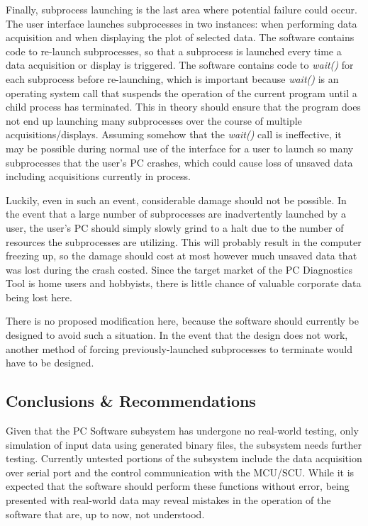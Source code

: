 Finally, subprocess launching is the last area where potential failure could occur. The user interface
launches subprocesses in two instances: when performing data acquisition and when displaying the plot
of selected data. The software contains code to re-launch subprocesses, so that a subprocess is launched
every time a data acquisition or display is triggered. The software contains code to \textit{wait()} 
for each subprocess before re-launching, which is important because \textit{wait()} is an operating system
call that suspends the operation of the current program until a child process has terminated. This in theory
should ensure that the program does not end up launching many subprocesses over the course of multiple 
acquisitions/displays. Assuming somehow that the \textit{wait()} call is ineffective, it may
be possible during normal use of the interface for a user to launch so many subprocesses that the user's
PC crashes, which could cause loss of unsaved data including acquisitions currently in process.

Luckily, even in such an event, considerable damage should not be possible. In the event that a large
number of subprocesses are inadvertently launched by a user, the user's PC should simply slowly grind
to a halt due to the number of resources the subprocesses are utilizing. This will probably result in
the computer freezing up, so the damage should cost at most however much unsaved data that was lost
during the crash costed. Since the target market of the PC Diagnostics Tool is home users and hobbyists,
there is little chance of valuable corporate data being lost here.

There is no proposed modification here, because the software should currently be designed to avoid
such a situation. In the event that the design does not work, another method of forcing previously-launched
subprocesses to terminate would have to be designed. 


\subsection[Conclusions \& Recommendations]{Conclusions \& Recommendations}
Given that the PC Software subsystem has undergone no real-world testing, only 
simulation of input data using generated binary files, the subsystem needs further
testing. Currently untested portions of the subsystem include the data acquisition
over serial port and the control communication with the MCU/SCU. While it 
is expected that the software should perform these functions without error, being
presented with real-world data may reveal mistakes in the operation of the software 
that are, up to now, not understood.

